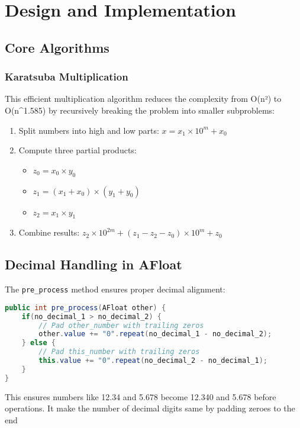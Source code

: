\documentclass{article}
\begin{document}
\section{Design and Implementation}
\subsection{Core Algorithms}
\subsubsection{Karatsuba Multiplication}
This efficient multiplication algorithm reduces the complexity from O(n²) to O(n^{1.585}) by recursively breaking the problem into smaller subproblems:

\begin{enumerate}
    \item Split numbers into high and low parts: $x = x_1 \times 10^m + x_0$
    \item Compute three partial products:
    \begin{itemize}
        \item $z_0 = x_0 \times y_0$
        \item $z_1 = (x_1 + x_0) \times (y_1 + y_0)$
        \item $z_2 = x_1 \times y_1$
    \end{itemize}
    \item Combine results: $z_2 \times 10^{2m} + (z_1 - z_2 - z_0) \times 10^m + z_0$
\end{enumerate}

\subsection{Decimal Handling in AFloat}
The \texttt{pre\_process} method ensures proper decimal alignment:

\begin{lstlisting}[language=Java]
public int pre_process(AFloat other) {
    if(no_decimal_1 > no_decimal_2) {
        // Pad other_number with trailing zeros
        other.value += "0".repeat(no_decimal_1 - no_decimal_2);
    } else {
        // Pad this_number with trailing zeros
        this.value += "0".repeat(no_decimal_2 - no_decimal_1);
    }
}
\end{lstlisting}

This ensures numbers like 12.34 and 5.678 become 12.340 and 5.678 before operations. It make the number of decimal digits same by padding zeroes to the end
\end{document}
